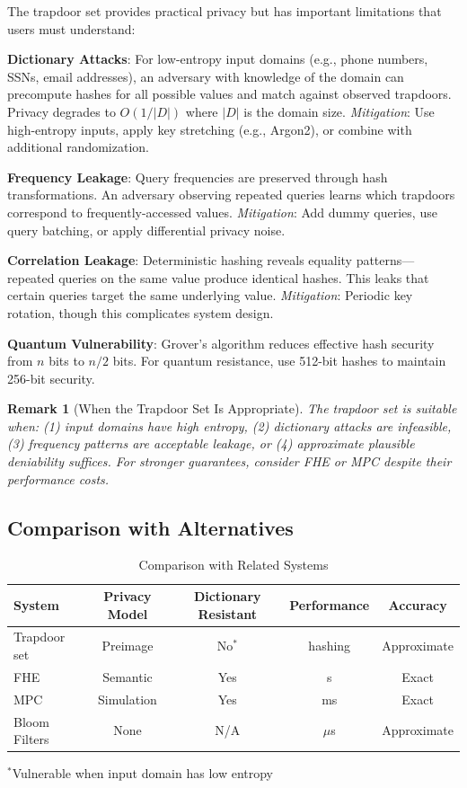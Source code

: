 \documentclass[10pt,conference]{IEEEtran}
\newtheorem{remark}[theorem]{Remark}
\begin{document}
The trapdoor set provides practical privacy but has important limitations that users must understand:

\textbf{Dictionary Attacks}: For low-entropy input domains (e.g., phone numbers, SSNs, email addresses), an adversary with knowledge of the domain can precompute hashes for all possible values and match against observed trapdoors. Privacy degrades to $O(1/|D|)$ where $|D|$ is the domain size. \emph{Mitigation}: Use high-entropy inputs, apply key stretching (e.g., Argon2), or combine with additional randomization.

\textbf{Frequency Leakage}: Query frequencies are preserved through hash transformations. An adversary observing repeated queries learns which trapdoors correspond to frequently-accessed values. \emph{Mitigation}: Add dummy queries, use query batching, or apply differential privacy noise.

\textbf{Correlation Leakage}: Deterministic hashing reveals equality patterns---repeated queries on the same value produce identical hashes. This leaks that certain queries target the same underlying value. \emph{Mitigation}: Periodic key rotation, though this complicates system design.

\textbf{Quantum Vulnerability}: Grover's algorithm reduces effective hash security from $n$ bits to $n/2$ bits. For quantum resistance, use 512-bit hashes to maintain 256-bit security.

\begin{remark}[When the Trapdoor Set Is Appropriate]
The trapdoor set is suitable when: (1) input domains have high entropy, (2) dictionary attacks are infeasible, (3) frequency patterns are acceptable leakage, or (4) approximate plausible deniability suffices. For stronger guarantees, consider FHE or MPC despite their performance costs.
\end{remark}

\subsection{Comparison with Alternatives}

\begin{table}[h]
\centering
\caption{Comparison with Related Systems}
\label{tab:comparison}
\begin{tabular}{lcccc}
\toprule
System & Privacy Model & Dictionary Resistant & Performance & Accuracy \\
\midrule
Trapdoor set & Preimage & No$^*$ & hashing & Approximate \\
FHE & Semantic & Yes & s & Exact \\
MPC & Simulation & Yes & ms & Exact \\
Bloom Filters & None & N/A & $\mu$s & Approximate \\
\bottomrule
\end{tabular}
\end{table}
\vspace{-0.5em}
{\footnotesize $^*$Vulnerable when input domain has low entropy}
\vspace{0.5em}
\end{document}
